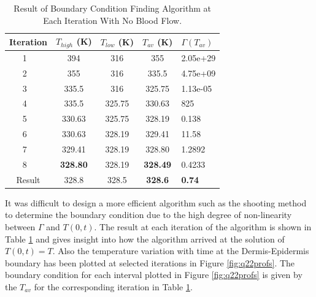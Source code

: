 \documentclass[11pt]{article}
\newcommand{\ra}[1]{\renewcommand{\arraystretch}{#1}}
\begin{document}
\begin{table}[!h]
\centering %
\ra{1.3}
\begin{tabular}{@{}ccccl@{}}\toprule
 Iteration  & $T_{high}$ (K) & $T_{low}$ (K) &  $T_{av}$ (K) & $\Gamma (T_{av}) $ \\
\midrule
1 \   & 394 & 316  &  355  &  2.05e+29\\
2 \   & 355 & 316  &  335.5  & 4.75e+09 \\
3 \   & 335.5 & 316  &  325.75  &  1.13e-05 \\
4 \   & 335.5 & 325.75  & 330.63  & 825 \\
5 \   & 330.63 & 325.75  &  328.19  & 0.138 \\
6 \   & 330.63 & 328.19  & 329.41  &  11.58\\
7 \   & 329.41 & 328.19  &  328.80  & 1.2892  \\
8 \   & \textbf{328.80} & 328.19  &  \textbf{328.49}  & 0.4233  \\
\midrule
Result & 328.8 & 328.5 & \textbf{328.6} & \textbf{0.74}\\
\bottomrule
\end{tabular}
\caption{Result of Boundary Condition Finding Algorithm at Each Iteration With No  Blood Flow.}
\label{table:findbc}
\end{table}

 It was difficult to design a more efficient algorithm such as the shooting method to determine the boundary condition due to the high degree of non-linearity between $\Gamma$ and $T(0,t)$. The result at each iteration of the algorithm is shown in Table \ref{table:findbc} and gives insight into how the algorithm arrived at the solution of $T(0, t) =T$. Also the temperature variation with time at the Dermis-Epidermis boundary has been plotted at selected iterations in Figure \ref{fig:q22profs}. The boundary condition for each interval plotted in Figure \ref{fig:q22profs} is given by the $T_{av}$ for the corresponding iteration in Table \ref{table:findbc}. \\
\end{document}
